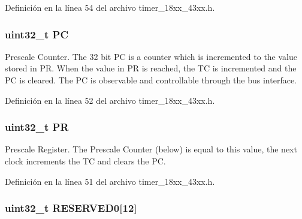 Definición en la línea 54 del archivo timer\+\_\+18xx\+\_\+43xx.\+h.

\subsubsection[{\texorpdfstring{PC}{PC}}]{ uint32\+\_\+t PC}\hypertarget{struct_l_p_c___t_i_m_e_r___t_a84724e7860a32fe120a1627483dfa5c5}{}\label{struct_l_p_c___t_i_m_e_r___t_a84724e7860a32fe120a1627483dfa5c5}
Prescale Counter. The 32 bit PC is a counter which is incremented to the value stored in PR. When the value in PR is reached, the TC is incremented and the PC is cleared. The PC is observable and controllable through the bus interface. 

Definición en la línea 52 del archivo timer\+\_\+18xx\+\_\+43xx.\+h.

\subsubsection[{\texorpdfstring{PR}{PR}}]{ uint32\+\_\+t PR}\hypertarget{struct_l_p_c___t_i_m_e_r___t_af8d25514079514d38c104402f46470af}{}\label{struct_l_p_c___t_i_m_e_r___t_af8d25514079514d38c104402f46470af}
Prescale Register. The Prescale Counter (below) is equal to this value, the next clock increments the TC and clears the PC. 

Definición en la línea 51 del archivo timer\+\_\+18xx\+\_\+43xx.\+h.

\subsubsection[{\texorpdfstring{R\+E\+S\+E\+R\+V\+E\+D0}{RESERVED0}}]{ uint32\+\_\+t R\+E\+S\+E\+R\+V\+E\+D0\mbox{[}12\mbox{]}}\hypertarget{struct_l_p_c___t_i_m_e_r___t_a870db4ca47c36cc0c7c2c01c36ae5de1}{}\label{struct_l_p_c___t_i_m_e_r___t_a870db4ca47c36cc0c7c2c01c36ae5de1}


